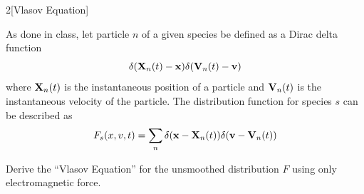 \documentclass[12pt]{article}
\begin{document}
\begin{problem}{2}[Vlasov Equation]

As done in class, let particle $n$ of a given species be defined as a Dirac
delta function
\begin{equation}
    \delta(\vb{X}_n(t)-\vb{x})\delta(\vb{V}_n(t)-\vb{v}) 
\end{equation}
where $\vb{X}_n(t)$ is the instantaneous position of a particle and
$\vb{V}_n(t)$ is the instantaneous velocity of the particle. The distribution
function for species $s$ can be described as
\begin{equation}\label{p2:dist_func}
    F_s(x,v,t)=\sum_n\delta(\vb{x}-\vb{X}_n(t))\delta(\vb{v}-\vb{V}_n(t)) 
\end{equation}

Derive the ``Vlasov Equation'' for the unsmoothed distribution $F$ using only
electromagnetic force.


\end{problem}
\end{document}
